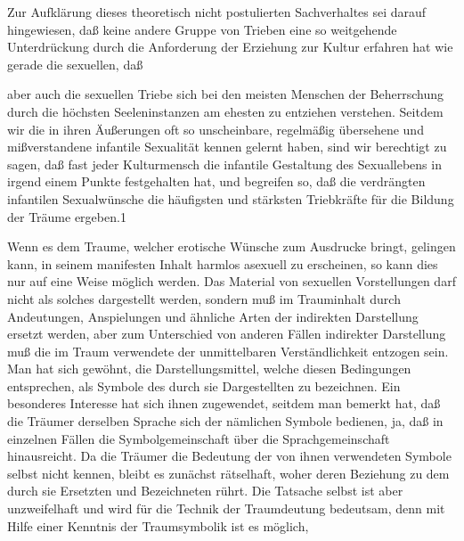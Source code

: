 \documentclass{article}
\begin{document}
            
        \pstart
        Zur Aufklärung dieses theoretisch nicht postulierten Sachverhaltes sei darauf
               hingewiesen, daß keine andere Gruppe von Trieben eine so weitgehende
               Unterdrückung durch die Anforderung der Erziehung zur Kultur erfahren hat wie
               gerade die sexuellen, daß
        \pend
    
         
            
            
            
        \pstart
        aber auch die sexuellen Triebe sich bei den meisten Menschen der
               Beherrschung durch die höchsten Seeleninstanzen am ehesten zu entziehen
               verstehen. Seitdem wir die in ihren Äußerungen oft so unscheinbare, regelmäßig
               übersehene und mißverstandene
               infantile Sexualität kennen gelernt haben, sind
               wir berechtigt zu sagen, daß fast jeder Kulturmensch die infantile
               Gestaltung des Sexuallebens in irgend einem Punkte festgehalten hat, und
               begreifen so, daß die verdrängten infantilen Sexualwünsche die
               häufigsten und stärksten Triebkräfte für die Bildung der Träume ergeben.1
        \pend
    
            
        \pstart
        Wenn es dem Traume, welcher erotische Wünsche zum Ausdrucke bringt,
               gelingen kann, in seinem manifesten Inhalt harmlos asexuell zu
               erscheinen, so kann dies nur auf eine Weise möglich werden. Das Material von
               sexuellen Vorstellungen darf nicht als solches dargestellt werden, sondern muß
               im Trauminhalt durch Andeutungen, Anspielungen und ähnliche
               Arten der indirekten Darstellung ersetzt werden, aber zum Unterschied von
               anderen Fällen indirekter Darstellung muß die im Traum verwendete der
               unmittelbaren Verständlichkeit entzogen sein. Man hat sich gewöhnt, die
               Darstellungsmittel, welche diesen Bedingungen entsprechen, als Symbole des durch sie Dargestellten zu
               bezeichnen. Ein besonderes Interesse hat sich ihnen zugewendet, seitdem man
               bemerkt hat, daß die Träumer derselben Sprache sich der nämlichen
               Symbole bedienen, ja, daß in einzelnen Fällen die Symbolgemeinschaft über die
                  Sprachgemeinschaft hinausreicht. Da die Träumer die Bedeutung
               der von ihnen verwendeten Symbole selbst nicht kennen, bleibt es zunächst
               rätselhaft, woher deren Beziehung zu dem durch sie Ersetzten und Bezeichneten
               rührt. Die Tatsache selbst ist aber unzweifelhaft und wird für die Technik der
               Traumdeutung bedeutsam, denn mit Hilfe einer Kenntnis der
               Traumsymbolik ist es möglich,
        \pend
    
\end{document}
